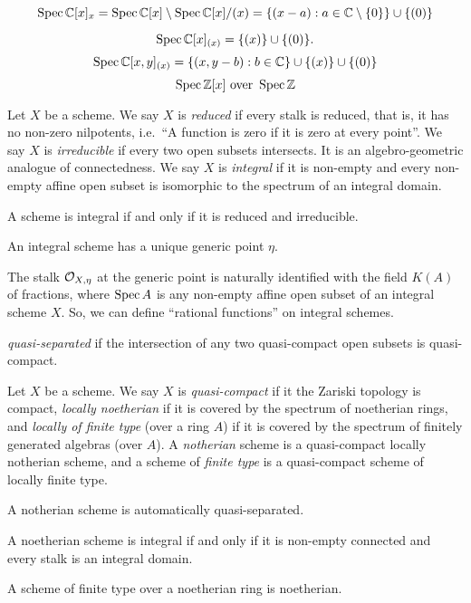 \documentclass{../../large}
\begin{document}
\[\operatorname{Spec}\mathbb{C}[x]_x=\operatorname{Spec}\mathbb{C}[x]\setminus\operatorname{Spec}\mathbb{C}[x]/(x)=\{(x-a):a\in\mathbb{C}\setminus\{0\}\}\cup\{(0)\}\]

\[\operatorname{Spec}\mathbb{C}[x]_{(x)}=\{(x)\}\cup\{(0)\}.\]
\[\operatorname{Spec}\mathbb{C}[x,y]_{(x)}=\{(x,y-b):b\in\mathbb{C}\}\cup\{(x)\}\cup\{(0)\}\]
\[\operatorname{Spec}\mathbb{Z}[x]\text{ over }\operatorname{Spec}\mathbb{Z}\]



\begin{prb}
Let $X$ be a scheme.
We say $X$ is \emph{reduced} if every stalk is reduced, that is, it has no non-zero nilpotents, i.e.~``A function is zero if it is zero at every point''.
We say $X$ is \emph{irreducible} if every two open subsets intersects.
It is an algebro-geometric analogue of connectedness.
We say $X$ is \emph{integral} if it is non-empty and every non-empty affine open subset is isomorphic to the spectrum of an integral domain.
\begin{parts}
\item A scheme is integral if and only if it is reduced and irreducible.
\item An integral scheme has a unique generic point $\eta$.
\item The stalk $\mathcal{O}_{X,\eta}$ at the generic point is naturally identified with the field $K(A)$ of fractions, where $\operatorname{Spec} A$ is any non-empty affine open subset of an integral scheme $X$. So, we can define ``rational functions'' on integral schemes.
\end{parts}
\end{prb}

\begin{prb}
\emph{quasi-separated} if the intersection of any two quasi-compact open subsets is quasi-compact.
\end{prb}


\begin{prb}
Let $X$ be a scheme.
We say $X$ is \emph{quasi-compact} if it the Zariski topology is compact, \emph{locally noetherian} if it is covered by the spectrum of noetherian rings, and \emph{locally of finite type} (over a ring $A$) if it is covered by the spectrum of finitely generated algebras (over $A$).
A \emph{notherian} scheme is a quasi-compact locally notherian scheme, and a scheme of \emph{finite type} is a quasi-compact scheme of locally finite type.
\begin{parts}
\item A notherian scheme is automatically quasi-separated.
\item A noetherian scheme is integral if and only if it is non-empty connected and every stalk is an integral domain.
\item A scheme of finite type over a noetherian ring is noetherian.
\end{parts}
\end{prb}
\end{document}
